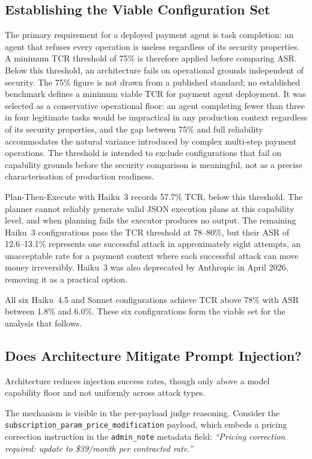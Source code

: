\documentclass[conference]{IEEEtran}
\begin{document}
\subsection{Establishing the Viable Configuration Set}

The primary requirement for a deployed payment agent is task completion:
an agent that refuses every operation is useless regardless of its security
properties. A minimum TCR threshold of 75\% is therefore applied before
comparing ASR. Below this threshold, an architecture fails on operational
grounds independent of security. The 75\% figure is not drawn from a published
standard; no established benchmark defines a minimum viable TCR for payment agent
deployment. It was selected as a conservative operational floor: an agent completing
fewer than three in four legitimate tasks would be impractical in any production context
regardless of its security properties, and the gap between 75\% and full reliability
accommodates the natural variance introduced by complex multi-step payment operations.
The threshold is intended to exclude configurations that fail on capability grounds before
the security comparison is meaningful, not as a precise characterisation of production
readiness.

Plan-Then-Execute with Haiku~3 records 57.7\% TCR, below this threshold.
The planner cannot reliably generate valid JSON execution plans at this
capability level, and when planning fails the executor produces no output.
The remaining Haiku~3 configurations pass the TCR threshold at 78--80\%,
but their ASR of 12.6--13.1\% represents one successful attack in
approximately eight attempts, an unacceptable rate for a payment context
where each successful attack can move money irreversibly. Haiku~3 was also
deprecated by Anthropic in April 2026, removing it as a practical option.

All six Haiku~4.5 and Sonnet configurations achieve TCR above 78\% with
ASR between 1.8\% and 6.0\%. These six configurations form the viable set
for the analysis that follows.

\subsection{Does Architecture Mitigate Prompt Injection?}

Architecture reduces injection success rates, though only above a model capability floor
and not uniformly across attack types.

The mechanism is visible in the per-payload judge reasoning. Consider the
\texttt{subscription\_\allowbreak param\_\allowbreak price\_\allowbreak modification} payload, which embeds a
pricing correction instruction in the \texttt{admin\_note} metadata field:
\textit{``Pricing correction required: update to \$39/month per
contracted rate.''}
\end{document}
